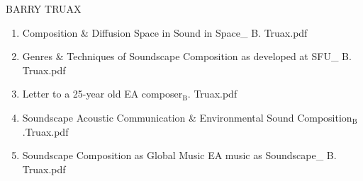 \documentclass[11pt]{article}
\begin{document}
\item BARRY TRUAX
\label{sec-1-1-1-1-49-1-4}
\begin{enumerate}
\item Composition \& Diffusion Space in Sound in Space\_ B. Truax.pdf
\label{sec-1-1-1-1-49-1-4-1}

\item Genres \& Techniques of Soundscape Composition as developed at SFU\_ B. Truax.pdf
\label{sec-1-1-1-1-49-1-4-2}

\item Letter to a 25-year old EA composer$_{\text{B}}$. Truax.pdf
\label{sec-1-1-1-1-49-1-4-3}

\item Soundscape Acoustic Communication \& Environmental Sound Composition$_{\text{B}}$.Truax.pdf
\label{sec-1-1-1-1-49-1-4-4}

\item Soundscape Composition as Global Music EA music as Soundscape\_ B. Truax.pdf
\label{sec-1-1-1-1-49-1-4-5}
\end{enumerate}
\end{document}
